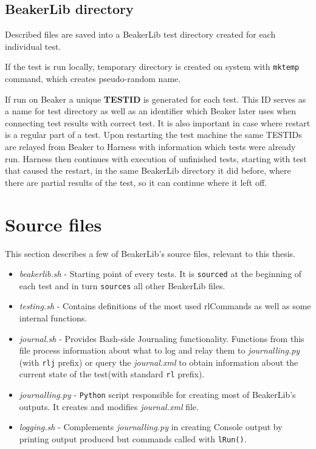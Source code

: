 \subsection{BeakerLib directory}
\label{beakerlib_dir}
Described files are saved into a BeakerLib test directory created for each individual test. 

If the test is run locally, temporary directory is created on system with \texttt{mktemp} command, which creates pseudo-random name.

If run on Beaker a unique \textbf{TESTID} is generated for each test. This ID serves as a name for test directory as well as an identifier which Beaker later uses when connecting test results with correct test. It is also important in case where restart is a regular part of a test. Upon restarting the test machine the same TESTIDs are relayed from Beaker to Harness with information which tests were already run. Harness then continues with execution of unfinished tests, starting with test that caused the restart, in the same BeakerLib directory it did before, where there are partial results of the test, so it can continue where it left off.

\section{Source files}
This section describes a few of BeakerLib's source files, relevant to this thesis.
\begin{itemize}
\item \textit{beakerlib.sh} - Starting point of every tests. It is \texttt{sourced} at the beginning of each test and in turn \texttt{sources} all other BeakerLib files.
\item \textit{testing.sh} - Contains definitions of the most used rlCommands as well as some internal functions.
\item \textit{journal.sh} - Provides Bash-side Journaling functionality. Functions from this file process information about what to log and relay them to \textit{journalling.py} (with \texttt{rlj} prefix) or query the \textit{journal.xml} to obtain information about the current state of the test(with standard \texttt{rl} prefix).
\item \textit{journalling.py} - \texttt{Python} script responsible for creating most of BeakerLib's outputs. It creates and modifies \textit{journal.xml} file.
\item \textit{logging.sh} - Complements \textit{journalling.py} in creating Console output by printing output produced but commands called with \texttt{lRun()}.
\end{itemize}

